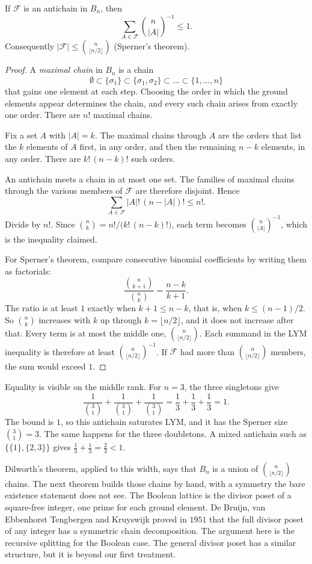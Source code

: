 \begin{theorem}\label{orders:thm:lym}
If $\mathcal F$ is an antichain in $B_n$, then
\[
\sum_{A\in\mathcal F}\binom n{|A|}^{-1}\le 1.
\]
Consequently $|\mathcal F|\le\binom n{\lfloor n/2\rfloor}$ (Sperner's theorem).
\end{theorem}
\begin{proof}
A \emph{maximal chain} in $B_n$ is a chain
\[
\emptyset\subset\{\sigma_1\}\subset\{\sigma_1,\sigma_2\}\subset\dots\subset\{1,\dots,n\}
\]
that gains one element at each step. Choosing the order in which the ground elements appear determines the chain, and every such chain arises from exactly one order. There are $n!$ maximal chains.

Fix a set $A$ with $|A|=k$. The maximal chains through $A$ are the orders that list the $k$ elements of $A$ first, in any order, and then the remaining $n-k$ elements, in any order. There are $k!\,(n-k)!$ such orders.

An antichain meets a chain in at most one set. The families of maximal chains through the various members of $\mathcal F$ are therefore disjoint. Hence
\[
\sum_{A\in\mathcal F}|A|!\,(n-|A|)!\le n!.
\]
Divide by $n!$. Since $\binom n k=n!/\bigl(k!\,(n-k)!\bigr)$, each term becomes $\binom n{|A|}^{-1}$, which is the inequality claimed.

For Sperner's theorem, compare consecutive binomial coefficients by writing them as factorials:
\[
\frac{\binom n{k+1}}{\binom nk}=\frac{n-k}{k+1}.
\]
The ratio is at least $1$ exactly when $k+1\le n-k$, that is, when $k\le (n-1)/2$. So $\binom nk$ increases with $k$ up through $k=\lfloor n/2\rfloor$, and it does not increase after that. Every term is at most the middle one, $\binom n{\lfloor n/2\rfloor}$. Each summand in the LYM inequality is therefore at least $\binom n{\lfloor n/2\rfloor}^{-1}$. If $\mathcal F$ had more than $\binom n{\lfloor n/2\rfloor}$ members, the sum would exceed $1$.
\end{proof}

Equality is visible on the middle rank. For $n=3$, the three singletons give
\[
\frac1{\binom31}+\frac1{\binom31}+\frac1{\binom31}=\frac13+\frac13+\frac13=1.
\]
The bound is $1$, so this antichain saturates LYM, and it has the Sperner size $\binom31=3$. The same happens for the three doubletons. A mixed antichain such as $\{\{1\},\{2,3\}\}$ gives $\tfrac13+\tfrac13=\tfrac23<1$.

Dilworth's theorem, applied to this width, says that $B_n$ is a union of $\binom n{\lfloor n/2\rfloor}$ chains. The next theorem builds those chains by hand, with a symmetry the bare existence statement does not see. The Boolean lattice is the divisor poset of a square-free integer, one prime for each ground element. De Bruijn, van Ebbenhorst Tengbergen and Kruyswijk proved in $1951$ that the full divisor poset of any integer has a symmetric chain decomposition. The argument here is the recursive splitting for the Boolean case. The general divisor poset has a similar structure, but it is beyond our first treatment.

